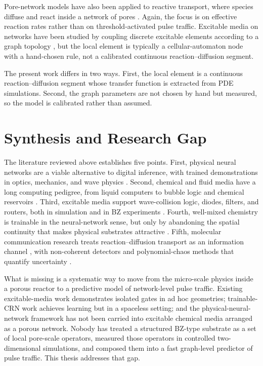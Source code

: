 Pore-network models have also been applied to reactive transport, where species diffuse and react inside a network of pores \cite{meakin2009modeling}.
Again, the focus is on effective reaction rates rather than on threshold-activated pulse traffic.
Excitable media on networks have been studied by coupling discrete excitable elements according to a graph topology \cite{kinouchi2006optimal}, but the local element is typically a cellular-automaton node with a hand-chosen rule, not a calibrated continuous reaction--diffusion segment.

The present work differs in two ways.
First, the local element is a continuous reaction--diffusion segment whose transfer function is extracted from PDE simulations.
Second, the graph parameters are not chosen by hand but measured, so the model is calibrated rather than assumed.

\section{Synthesis and Research Gap}
\label{sec:lit_synthesis}

The literature reviewed above establishes five points.
First, physical neural networks are a viable alternative to digital inference, with trained demonstrations in optics, mechanics, and wave physics \cite{lin2018alloptical, stern2021physical, wright2022deep, hughes2019wave}.
Second, chemical and fluid media have a long computing pedigree, from liquid computers to bubble logic and chemical reservoirs \cite{adamatzky2019liquid, prakash2007bubble, baltussen2024chemical}.
Third, excitable media support wave-collision logic, diodes, filters, and routers, both in simulation and in BZ experiments \cite{toth1995logic, steinbock1996chemical, adamatzky2002xor, agladze1996chemical, gorecka2003tshaped}.
Fourth, well-mixed chemistry is trainable in the neural-network sense, but only by abandoning the spatial continuity that makes physical substrates attractive \cite{dack2024rncrn, cherry2018scaling}.
Fifth, molecular communication research treats reaction--diffusion transport as an information channel \cite{farsad2016comprehensive, guo2021molecular}, with non-coherent detectors and polynomial-chaos methods that quantify uncertainty \cite{lin2023diversity, abbaszadeh2019uncertainty}.

What is missing is a systematic way to move from the micro-scale physics inside a porous reactor to a predictive model of network-level pulse traffic.
Existing excitable-media work demonstrates isolated gates in ad hoc geometries; trainable-CRN work achieves learning but in a spaceless setting; and the physical-neural-network framework has not been carried into excitable chemical media arranged as a porous network.
Nobody has treated a structured BZ-type substrate as a set of local pore-scale operators, measured those operators in controlled two-dimensional simulations, and composed them into a fast graph-level predictor of pulse traffic.
This thesis addresses that gap.

